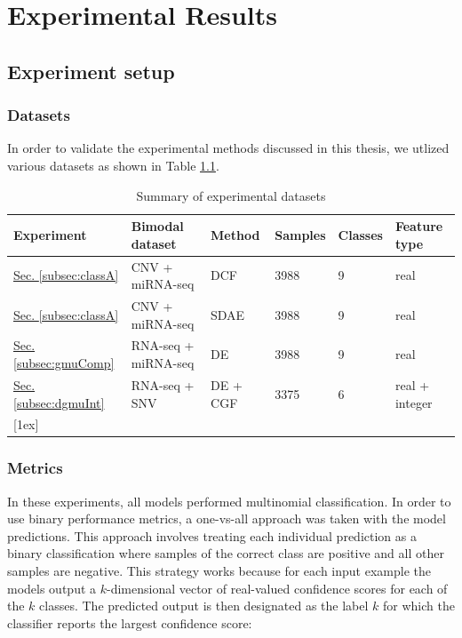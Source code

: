 \chapter{Experimental Results} \label{chap:results}

\section{Experiment setup}
\subsection{Datasets}

In order to validate the experimental methods discussed in this thesis, we utlized various datasets as shown in Table \ref{table:expData}. 


\begin{table}[ht]
\caption{Summary of experimental datasets} %
\centering %
\begin{tabular}{l l l l l l} %
\hline %
Experiment & Bimodal dataset & Method & Samples & Classes & Feature type \\ %
\hline %
\hyperlink{subsec:classA}{Sec. \ref{subsec:classA}} & CNV + miRNA-seq & DCF & 3988 & 9 & real\\ 
\hyperlink{subsec:classA}{Sec. \ref{subsec:classA}} & CNV + miRNA-seq & SDAE & 3988 & 9 & real\\ 
\hyperlink{subsec:gmuComp}{Sec. \ref{subsec:gmuComp}} & RNA-seq + miRNA-seq & DE & 3988 & 9 & real\\ 
\hyperlink{subsec:dgmuInt}{Sec. \ref{subsec:dgmuInt}} & RNA-seq + SNV & DE + CGF & 3375 & 6 & real + integer\\ 
[1ex]   %
\hline %
\end{tabular}
\label{table:expData}
\end{table}

\subsection{Metrics}

In these experiments, all models performed multinomial classification. In order to use binary performance metrics, a one-vs-all approach was taken with the model predictions. This approach involves treating each individual prediction as a binary classification where samples of the correct class are positive and all other samples are negative. This strategy works because for each input example the models output a $k$-dimensional vector of real-valued confidence scores for each of the $k$ classes. The predicted output is then designated as the label $k$ for which the classifier reports the largest confidence score:

